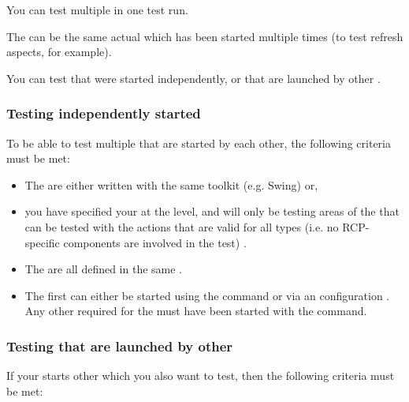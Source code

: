 You can test multiple \gdauts{} in one test run.

The \gdauts{} can be the same actual \gdaut{} which has been started multiple times (to test refresh aspects, for example). 

You can test \gdauts{} that were started independently, or \gdauts{} that are launched by other \gdauts{}.


\subsubsection{Testing independently started \gdauts{}}

To be able to test multiple \gdauts{} that are  started by each other, the following criteria must be met:

\begin{itemize}
\item The \gdauts{} are either written with the same toolkit (e.g. Swing) or,
\item you have specified your \gdproject{} at the  level, and will only be testing areas of the \gdauts{} that can be tested with the actions that are valid for all \gdaut{} types (i.e. no RCP-specific components are involved in the test) . 
\item The \gdauts{} are all defined in the same \gdproject{}.
\item The first \gdaut{} can either be started using the  command  or via an \gdaut{} configuration . Any other \gdauts{} required for the \gdjob{} must have been started with the  command.
\end{itemize}


\subsubsection{Testing \gdauts{} that are launched by other \gdauts{}}
\label{TasksLenientTest}

If your \gdaut{} starts other \gdauts{} which you also want to test, then the following criteria must be met:


